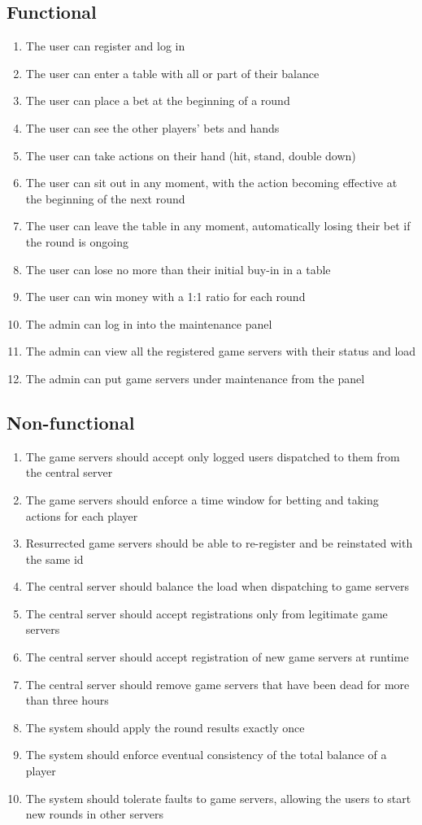 \documentclass{scrartcl}
\begin{document}
\subsection{Functional}
\begin{enumerate}
    \item The user can register and log in
    \item The user can enter a table with all or part of their balance
    \item The user can place a bet at the beginning of a round
    \item The user can see the other players' bets and hands
    \item The user can take actions on their hand (hit, stand, double down)
    \item The user can sit out in any moment, with the action becoming effective at the beginning of the next round
    \item The user can leave the table in any moment, automatically losing their bet if the round is ongoing
    \item The user can lose no more than their initial buy-in in a table
    \item The user can win money with a 1:1 ratio for each round
    \item The admin can log in into the maintenance panel
    \item The admin can view all the registered game servers with their status and load
    \item The admin can put game servers under maintenance from the panel
\end{enumerate}
\subsection{Non-functional}
\begin{enumerate}
    \item The game servers should accept only logged users dispatched to them from the central server
    \item The game servers should enforce a time window for betting and taking actions for each player
    \item Resurrected game servers should be able to re-register and be reinstated with the same id
    \item The central server should balance the load when dispatching to game servers
    \item The central server should accept registrations only from legitimate game servers
    \item The central server should accept registration of new game servers at runtime
    \item The central server should remove game servers that have been dead for more than three hours
    \item The system should apply the round results exactly once
    \item The system should enforce eventual consistency of the total balance of a player 
    \item The system should tolerate faults to game servers, allowing the users to start new rounds in other servers
\end{enumerate}
\end{document}
